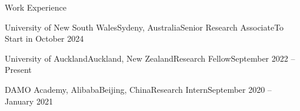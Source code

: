 \documentclass{resume} %
\begin{document}
\begin{rSection}{Work Experience}
\begin{rSubsection}{University of New South Wales}{Sydeny, Australia}{Senior Research Associate}{To Start in October 2024}
\end{rSubsection}
\begin{rSubsection}{University of Auckland}{Auckland, New Zealand}{Research Fellow}{September 2022 -- Present}
\end{rSubsection}
\begin{rSubsection}{DAMO Academy, Alibaba}{Beijing, China}{Research Intern}{September 2020 -- January 2021}
\end{rSubsection}
\end{rSection}
\end{document}
